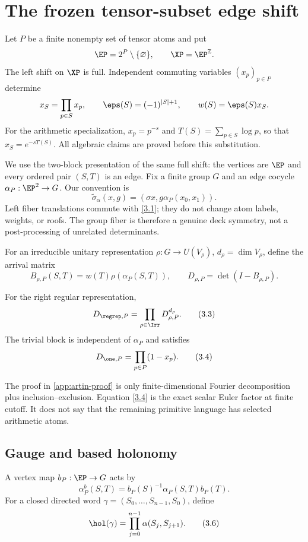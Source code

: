 \section{The frozen tensor-subset edge shift}
\label{sec:frozen}

Let $P$ be a finite nonempty set of tensor atoms and put
\[
  \EP=2^P\setminus\{\varnothing\},\qquad \XP=\EP^{\mathbb Z}.
\]
The left shift on $\XP$ is full.  Independent commuting variables
$(x_p)_{p\in P}$ determine
\[
 x_S=\prod_{p\in S}x_p,\qquad
 \eps(S)=(-1)^{|S|+1},\qquad w(S)=\eps(S)x_S.
\]
For the arithmetic specialization, $x_p=p^{-s}$ and
$T(S)=\sum_{p\in S}\log p$, so that $x_S=e^{-sT(S)}$.  All algebraic
claims are proved before this substitution.

We use the two-block presentation of the same full shift: the vertices are
$\EP$ and every ordered pair $(S,T)$ is an edge.  Fix a finite group $G$ and
an edge cocycle $\alpha_P:\EP^2\to G$.  Our convention is
\[
 \widetilde\sigma_\alpha(x,g)
   =(\sigma x,g\alpha_P(x_0,x_1)).
 \tag{3.1}\label{3.1}
\]
Left fiber translations commute with \eqref{3.1}; they do not change atom
labels, weights, or roofs.  The group fiber is therefore a genuine deck
symmetry, not a post-processing of unrelated determinants.

For an irreducible unitary representation
$\rho:G\to U(V_\rho)$, $d_\rho=\dim V_\rho$, define the arrival matrix
\[
 B_{\rho,P}(S,T)=w(T)\rho(\alpha_P(S,T)),\qquad
 D_{\rho,P}=\det(I-B_{\rho,P}).
 \tag{3.2}\label{3.2}
\]

\begin{proposition}
\label{prop:artin}
For the right regular representation,
\[
 D_{\regrep,P}=\prod_{\rho\in\Irr}D_{\rho,P}^{d_\rho}.
 \tag{3.3}\label{3.3}
\]
The trivial block is independent of $\alpha_P$ and satisfies
\[
 D_{\one,P}=\prod_{p\in P}(1-x_p).
 \tag{3.4}\label{3.4}
\]
\end{proposition}

The proof in \cref{app:artin-proof} is only finite-dimensional Fourier
decomposition plus inclusion--exclusion.  Equation \eqref{3.4} is the exact
scalar Euler factor at finite cutoff.  It does not say that the remaining
primitive language has selected arithmetic atoms.

\subsection{Gauge and based holonomy}

A vertex map $b_P:\EP\to G$ acts by
\[
 \alpha_P^b(S,T)=b_P(S)^{-1}\alpha_P(S,T)b_P(T).
 \tag{3.5}\label{3.5}
\]
For a closed directed word
$\gamma=(S_0,\ldots,S_{n-1},S_0)$, define
\[
 \hol(\gamma)=\prod_{j=0}^{n-1}\alpha(S_j,S_{j+1}).
 \tag{3.6}\label{3.6}
\]

